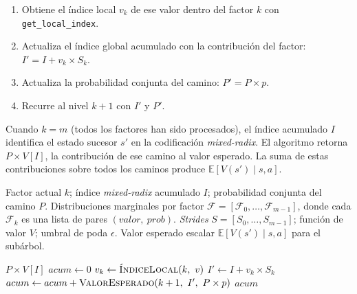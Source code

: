\begin{enumerate}
    \item Obtiene el índice local $v_k$ de ese valor dentro del factor $k$
        con \texttt{get\_local\_index}.
    \item Actualiza el índice global acumulado con la contribución del factor:
        $I' = I + v_k \times S_k$.
    \item Actualiza la probabilidad conjunta del camino: $P' = P \times p$.
    \item Recurre al nivel $k + 1$ con $I'$ y $P'$.
\end{enumerate}

Cuando $k = m$ (todos los factores han sido procesados), el índice acumulado $I$
identifica el estado sucesor $s'$ en la codificación
\textit{mixed-radix}. El algoritmo retorna $P \times V[I]$, la contribución de ese camino al valor
esperado. La suma de estas contribuciones
sobre todos los caminos produce $\mathbb{E}[V(s') \mid s, a]$.

\begin{algorithm}[H]
\caption{Valor esperado del estado sucesor sobre el esquema factorizado}
\label{alg:expected-value}
\begin{algorithmic}[1]
\Require Factor actual $k$; índice \textit{mixed-radix} acumulado $I$;
    probabilidad conjunta del camino $P$.
\Require Distribuciones marginales por factor
    $\mathcal{F} = [\mathcal{F}_0, \ldots, \mathcal{F}_{m-1}]$,
    donde cada $\mathcal{F}_k$ es una lista de pares $(valor,\ prob)$.
\Require \textit{Strides} $S = [S_0, \ldots, S_{m-1}]$;
    función de valor $V$; umbral de poda $\epsilon$.
\Ensure Valor esperado escalar $\mathbb{E}[V(s') \mid s, a]$ para el subárbol.

     
        \Return $P \times V[I]$
    \EndIf
    \State $acum \gets 0$
         
            \State $v_k \gets \textsc{ÍndiceLocal}(k,\ v)$
            \State $I' \gets I + v_k \times S_k$
            \State $acum \gets acum + \Call{ValorEsperado}{k+1,\ I',\ P \times p}$
        \EndIf
    \EndFor
    \Return $acum$
\EndFunction
\end{algorithmic}
\end{algorithm}

